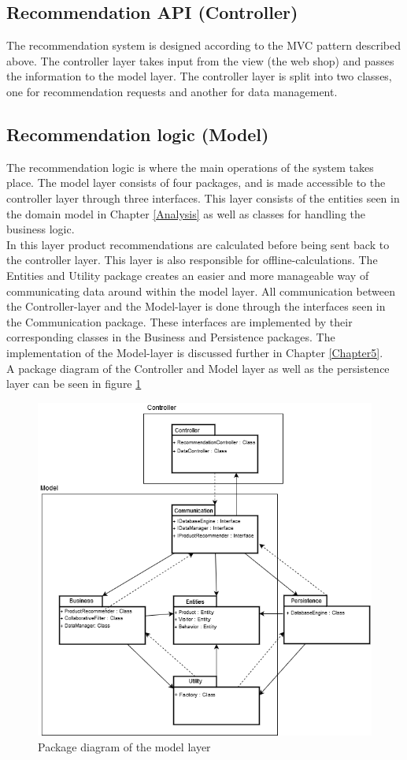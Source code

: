 \subsection{Recommendation API (Controller)}
The recommendation system is designed according to the MVC pattern described above. The controller layer takes input from the view (the web shop) and passes the information to the model layer. The controller layer is split into two classes, one for recommendation requests and another for data management.

\subsection{Recommendation logic (Model)}
The recommendation logic is where the main operations of the system takes place. The model layer consists of four packages, and is made accessible to the controller layer through three interfaces. This layer consists of the entities seen in the domain model in Chapter \ref{Analysis} as well as classes for handling the business logic. \\In this layer product recommendations are calculated before being sent back to the controller layer. This layer is also responsible for offline-calculations. The Entities and Utility package creates an easier and more manageable way of communicating data around within the model layer. All communication between the Controller-layer and the Model-layer is done through the interfaces seen in the Communication package. These interfaces are implemented by their corresponding classes in the Business and Persistence packages. The implementation of the Model-layer is discussed further in Chapter \ref{Chapter5}. \\
A package diagram of the Controller and Model layer as well as the persistence layer can be seen in figure \ref{fig:PackageDiagram}

\begin{figure}[H]
	\centering
	\includegraphics[width=.8\linewidth]{Figures/PackageDiagram.png}
	\caption{Package diagram of the model layer}
	\label{fig:PackageDiagram}
\end{figure}

